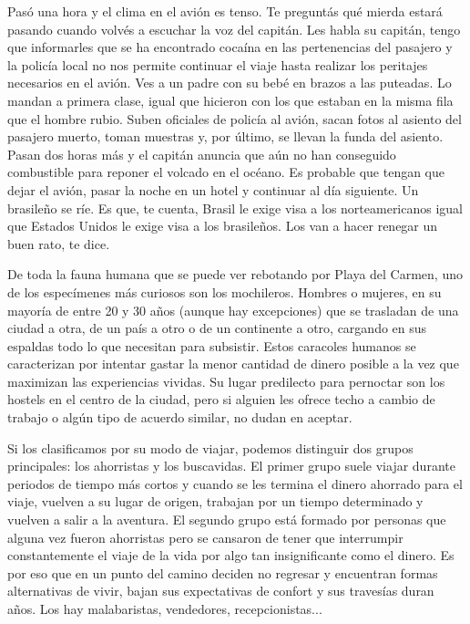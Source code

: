 \documentclass[12pt,twoside,openright,a5paper]{book}
\begin{document}
Pasó una hora y el clima en el avión es tenso. Te preguntás qué mierda
estará pasando cuando volvés a escuchar la voz del capitán. Les habla
su capitán, tengo que informarles que se ha encontrado cocaína en las
pertenencias del pasajero y la policía local no nos permite continuar el
viaje hasta realizar los peritajes necesarios en el avión. Ves a un padre
con su bebé en brazos a las puteadas. Lo mandan a primera clase, igual que
hicieron con los que estaban en la misma fila que el hombre rubio. Suben
oficiales de policía al avión, sacan fotos al asiento del pasajero muerto,
toman muestras y, por último, se llevan la funda del asiento. Pasan dos
horas más y el capitán anuncia que aún no han conseguido combustible para
reponer el volcado en el océano. Es probable que tengan que dejar el avión,
pasar la noche en un hotel y continuar al día siguiente. Un brasileño se
ríe. Es que, te cuenta, Brasil le exige visa a los norteamericanos igual
que Estados Unidos le exige visa a los brasileños. Los van a hacer renegar
un buen rato, te dice.

\vspace{0.5cm}

\hrulefill\hspace{0.2cm} \decofourleft\decofourright \hspace{0.2cm} \hrulefill
\vspace{0.5cm}

De toda la fauna humana que se puede ver rebotando por Playa del Carmen, uno
de los especímenes más curiosos son los mochileros. Hombres o mujeres,
en su mayoría de entre 20 y 30 años (aunque hay excepciones) que se
trasladan de una ciudad a otra, de un país a otro o de un continente a
otro, cargando en sus espaldas todo lo que necesitan para subsistir. Estos
caracoles humanos se caracterizan por intentar gastar la menor cantidad de
dinero posible a la vez que maximizan las experiencias vividas. Su lugar
predilecto para pernoctar son los hostels en el centro de la ciudad, pero
si alguien les ofrece techo a cambio de trabajo o algún tipo de acuerdo
similar, no dudan en aceptar.

Si los clasificamos por su modo de viajar, podemos distinguir dos grupos
principales: los ahorristas y los buscavidas. El primer grupo suele viajar
durante periodos de tiempo más cortos y cuando se les termina el dinero
ahorrado para el viaje, vuelven a su lugar de origen, trabajan por un
tiempo determinado y vuelven a salir a la aventura. El segundo grupo está
formado por personas que alguna vez fueron ahorristas pero se cansaron
de tener que interrumpir constantemente el viaje de la vida por algo tan
insignificante como el dinero. Es por eso que en un punto del camino
deciden no regresar y encuentran formas alternativas de vivir, bajan sus
expectativas de confort y sus travesías duran años. Los hay malabaristas,
vendedores, recepcionistas...
\end{document}
